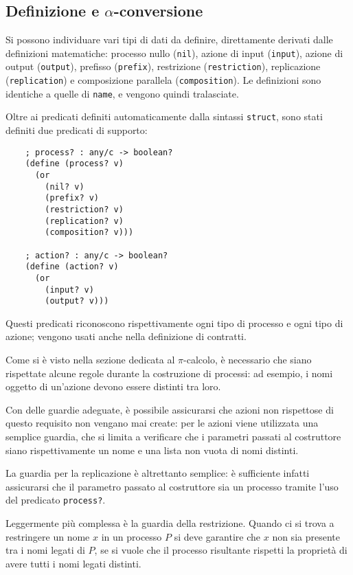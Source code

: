 \subsection{Definizione e \texorpdfstring{$\alpha$}{alfa}-conversione}

Si possono individuare vari tipi di dati da definire, direttamente derivati
dalle definizioni matematiche: processo nullo (\lstinline{nil}), azione di
input (\lstinline{input}), azione di output (\lstinline{output}), prefisso
(\lstinline{prefix}), restrizione (\lstinline{restriction}), replicazione
(\lstinline{replication}) e composizione parallela (\lstinline{composition}).
Le definizioni sono identiche a quelle di \lstinline{name}, e vengono quindi
tralasciate.

Oltre ai predicati definiti automaticamente dalla sintassi
\lstinline{struct}, sono stati definiti due predicati di supporto:

\begin{lstlisting}
    ; process? : any/c -> boolean?
    (define (process? v)
      (or
        (nil? v)
        (prefix? v)
        (restriction? v)
        (replication? v)
        (composition? v)))

    ; action? : any/c -> boolean?
    (define (action? v)
      (or
        (input? v)
        (output? v)))

\end{lstlisting}

Questi predicati riconoscono rispettivamente ogni tipo di processo e ogni
tipo di azione; vengono usati anche nella definizione di contratti.

Come si \`e visto nella sezione dedicata al $\pi$-calcolo, \`e necessario
che siano rispettate alcune regole durante la costruzione di processi: ad
esempio, i nomi oggetto di un'azione devono essere distinti tra loro.

Con delle guardie adeguate, \`e possibile assicurarsi che azioni non
rispettose di questo requisito non vengano mai create: per le azioni viene
utilizzata una semplice guardia, che si limita a verificare che i parametri
passati al costruttore siano rispettivamente un nome e una lista non vuota
di nomi distinti.

La guardia per la replicazione \`e altrettanto semplice: \`e sufficiente
infatti assicurarsi che il parametro passato al costruttore sia un processo
tramite l'uso del predicato \lstinline{process?}.

Leggermente pi\`u complessa \`e la guardia della restrizione. Quando ci si
trova a restringere un nome $x$ in un processo $P$ si deve garantire che
$x$ non sia presente tra i nomi legati di $P$, se si vuole che il processo
risultante rispetti la propriet\`a di avere tutti i nomi legati distinti.

